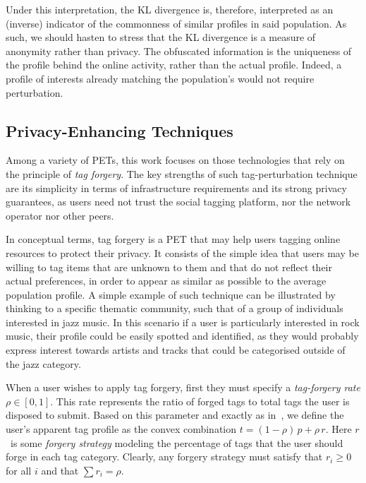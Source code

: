 Under this interpretation, the KL divergence is, therefore, interpreted as an (inverse) indicator of the commonness of similar profiles in said population. As such, we should hasten to stress that the KL divergence is a measure of anonymity rather than privacy. The obfuscated information is the uniqueness of the profile behind the online activity, rather than the actual profile. Indeed, a profile of interests already matching the population's would not require perturbation.

\subsection{Privacy-Enhancing Techniques}
\label{sec:pets}
Among a variety of PETs, this work focuses on those technologies that rely on the principle of \emph{tag forgery}. The key strengths of such tag-perturbation technique are its simplicity in terms of infrastructure requirements and its strong privacy guarantees, as users need not trust the social tagging platform, nor the network operator nor other peers.

In conceptual terms, tag forgery is a PET that may help users tagging online resources to protect their privacy. It consists of the simple idea that users may be willing to tag items that are unknown to them and that do not reflect their actual preferences, in order to appear as similar as possible to the average population profile. A simple example of such technique can be illustrated by thinking to a specific thematic community, such that of a group of individuals interested in jazz music. In this scenario if a user is particularly interested in rock music, their profile could be easily spotted and identified, as they would probably express interest towards artists and tracks that could be categorised outside of the jazz category.

When a user wishes to apply tag forgery, first they must specify a \emph{tag-forgery rate} $\rho \in [0,1]$. This rate represents the ratio of forged tags to total tags the user is disposed to submit.
Based on this parameter and exactly as in~\cite{Rebollo10IT}, we define the user's apparent tag profile as the convex combination $t = (1 - \rho)\,p + \rho\,r $.
Here $r$~is some \emph{forgery strategy} modeling the percentage of tags that the user should forge in each tag category.
Clearly, any forgery strategy must satisfy that $r_i \geqslant 0$ for all $i$ and that $\sum r_i = \rho$.

